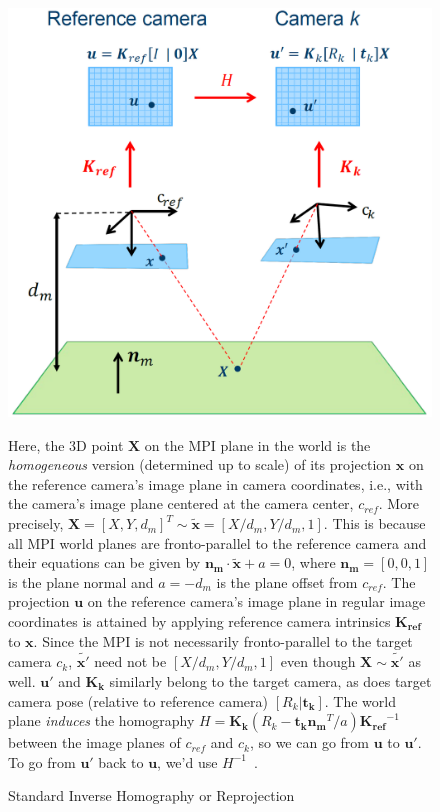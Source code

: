 \begin{figure}[!h]
    \includegraphics[width=0.75\columnwidth]{figures/standard-inverse-homography.png}
    \caption{Standard Inverse Homography or Reprojection~\cite{brann_forelesninger_2016}}
    \label{fig:standard-inverse-homography}
    {\small Here, the 3D point $\boldsymbol{X}$ on the MPI plane in the world is the \textit{homogeneous} version (determined up to scale) of its projection $\boldsymbol{x}$ on the reference camera's image plane in camera coordinates, i.e., with the camera's image plane centered at the camera center, $c_{ref}$. More precisely, $\boldsymbol{X} = [X,Y,d_m]^T \sim \tilde{\boldsymbol{x}} = [X/d_m,Y/d_m,1]$. This is because all MPI world planes are fronto-parallel to the reference camera and their equations can be given by $\boldsymbol{n_m \cdot \tilde{x}} + a = 0$, where $\boldsymbol{n_m} = [0,0,1]$ is the plane normal and $a = -d_m$ is the plane offset from $c_{ref}$. The projection $\boldsymbol{u}$ on the reference camera's image plane in regular image coordinates is attained by applying reference camera intrinsics $\boldsymbol{K_{ref}}$ to $\boldsymbol{x}$. Since the MPI is not necessarily fronto-parallel to the target camera $c_k$, $\tilde{\boldsymbol{x'}}$ need not be $[X/d_m,Y/d_m,1]$ even though $\boldsymbol{X} \sim \tilde{\boldsymbol{x'}}$ as well. $\boldsymbol{u'}$ and $\boldsymbol{K_k}$ similarly belong to the target camera, as does target camera pose (relative to reference camera) $[R_k|\boldsymbol{t_k}]$. The world plane \textit{induces} the homography $H = \boldsymbol{K_k} (R_k - \boldsymbol{t_k} \boldsymbol{n_m}^T / a) \boldsymbol{K_{ref}}^{-1}$ between the image planes of $c_{ref}$ and $c_k$, so we can go from $\boldsymbol{u}$ to $\boldsymbol{u'}$. To go from $\boldsymbol{u'}$ back to $\boldsymbol{u}$, we'd use $H^{-1}$~\cite{zikuicai_derivation_2019}.}  
\end{figure}

